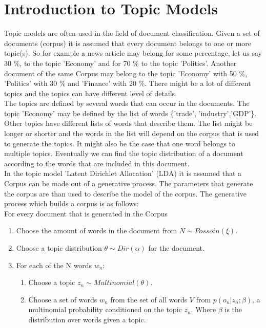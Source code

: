 \section{Introduction to Topic Models}
Topic models are often used in the field of document classification. Given a set of documents (corpus) it is assumed that every document belongs to one or more topic(s). So for example a news article may belong for some percentage, let us say 30 \%,  to the topic 'Economy' and for 70 \%  to the topic 'Politics'. Another document of the same Corpus may belong to the topic 'Economy' with 50 \%, 'Politics' with 30 \% and 'Finance' with 20 \%. There might be a lot of different topics and the topics can have different level of details. \\
The topics are defined by several words that can occur in the documents. The topic 'Economy' may be defined by the list of words \{'trade', 'industry','GDP'\}. Other topics have different lists of words that describe them. The list might be longer or shorter and the words in the list will depend on the corpus that is used to generate the topics. It might also be the case that one word belongs to multiple topics. Eventually we can find the topic distribution of a document according to the words that are included in this document.\\
In the topic model 'Latent Dirichlet Allocation' (LDA) it is assumed that a Corpus can be made out of a generative process. The parameters that generate the corpus are than used to describe the model of the corpus. The generative process which builds a corpus is as follows:\\
For every document that is generated in the Corpus
\begin{enumerate}
 \item Choose the amount of words in the document from $N \sim Possoin(\xi)$.
 \item Choose a topic distribution $\theta \sim Dir(\alpha)$ for the document.
 \item For each of the N words $w_n$:
 
 \begin{enumerate}
  \item Choose a topic $z_n \sim Multinomial(\theta)$.
  \item Choose a set of words $w_n$ from the set of all words $V$ from $p(o_n |z_n;\beta)$, a multinomial probability conditioned on the topic $z_n$. Where $\beta$ is the distribution over words given a topic.
 \end{enumerate}

\end{enumerate}

